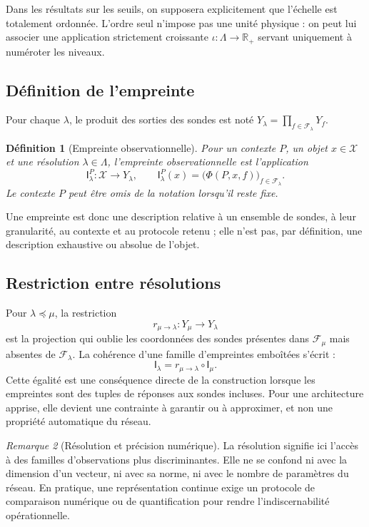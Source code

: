 \documentclass[11pt,a4paper]{article}
\newtheorem{definition}{Définition}[section]
\theoremstyle{remark}
\newtheorem{remark}[definition]{Remarque}
\newcommand{\X}{\mathcal X}
\newcommand{\R}{\mathbb R}
\newcommand{\F}{\mathcal F}
\newcommand{\Lam}{\Lambda}
\newcommand{\Emp}{\mathsf I}
\newcommand{\1}{\mathbf 1}
\begin{document}
Dans les résultats sur les seuils, on supposera explicitement que l'échelle est totalement ordonnée. L'ordre seul n'impose pas une unité physique : on peut lui associer une application strictement croissante $\iota:\Lam\to\R_+$ servant uniquement à numéroter les niveaux.

\subsection{Définition de l'empreinte}
Pour chaque $\lambda$, le produit des sorties des sondes est noté $Y_\lambda=\prod_{f\in\F_\lambda}Y_f$.
\begin{definition}[Empreinte observationnelle]
Pour un contexte $P$, un objet $x\in\X$ et une résolution $\lambda\in\Lam$, l'empreinte observationnelle est l'application
\[
\Emp^P_\lambda:\X\to Y_\lambda,
\qquad
\Emp^P_\lambda(x)=\bigl(\Phi(P,x,f)\bigr)_{f\in\F_\lambda}.
\]
Le contexte $P$ peut être omis de la notation lorsqu'il reste fixe.
\end{definition}

Une empreinte est donc une description relative à un ensemble de sondes, à leur granularité, au contexte et au protocole retenu ; elle n'est pas, par définition, une description exhaustive ou absolue de l'objet.

\subsection{Restriction entre résolutions}
Pour $\lambda\preceq\mu$, la restriction
\[
r_{\mu\to\lambda}:Y_\mu\to Y_\lambda
\]
est la projection qui oublie les coordonnées des sondes présentes dans $\F_\mu$ mais absentes de $\F_\lambda$. La cohérence d'une famille d'empreintes emboîtées s'écrit :
\[
\boxed{\Emp_\lambda=r_{\mu\to\lambda}\circ\Emp_\mu.}
\]
Cette égalité est une conséquence directe de la construction lorsque les empreintes sont des tuples de réponses aux sondes incluses. Pour une architecture apprise, elle devient une contrainte à garantir ou à approximer, et non une propriété automatique du réseau.

\begin{remark}[Résolution et précision numérique]
La résolution signifie ici l'accès à des familles d'observations plus discriminantes. Elle ne se confond ni avec la dimension d'un vecteur, ni avec sa norme, ni avec le nombre de paramètres du réseau. En pratique, une représentation continue exige un protocole de comparaison numérique ou de quantification pour rendre l'indiscernabilité opérationnelle.
\end{remark}
\end{document}

